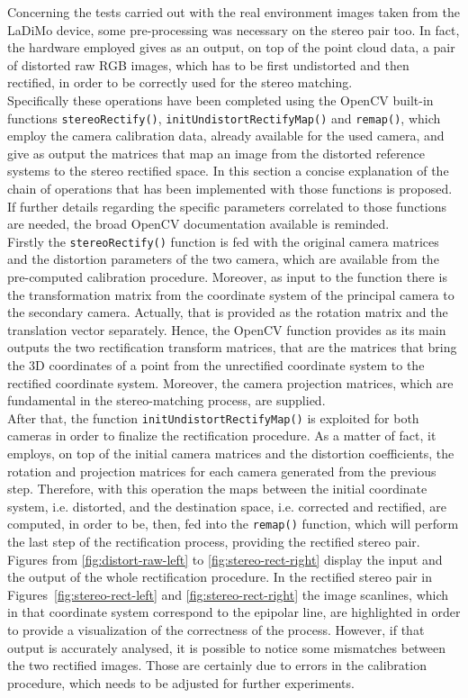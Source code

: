 Concerning the tests carried out with the real environment images taken from the LaDiMo device, some pre-processing was necessary on the stereo pair too. 
In fact, the hardware employed gives as an output, on top of the point cloud data, a pair of distorted raw RGB images, which has to be first undistorted and then rectified, in order to be correctly used for the stereo matching. \\
Specifically these operations have been completed using the OpenCV built-in functions \texttt{stereoRectify()}, \texttt{initUndistortRectifyMap()} and \texttt{remap()}, which employ the camera calibration data, already available for the used camera, and give as output the matrices that map an image from the distorted reference systems to the stereo rectified space.
In this section a concise explanation of the chain of operations that has been implemented with those functions is proposed.
If further details regarding the specific parameters correlated to those functions are needed, the broad OpenCV documentation available is reminded.\\
Firstly the \texttt{stereoRectify()} function is fed with the original camera matrices and the distortion parameters of the two camera, which are available from the pre-computed calibration procedure.
Moreover, as input to the function there is the transformation matrix from the coordinate system of the principal camera to the secondary camera.
Actually, that is provided as the rotation matrix and the translation vector separately.
Hence, the OpenCV function provides as its main outputs the two rectification transform matrices, that are the matrices that bring the 3D coordinates of a point from the unrectified coordinate system to the rectified coordinate system.
Moreover, the camera projection matrices, which are fundamental in the stereo-matching process, are supplied.\\
After that, the function \texttt{initUndistortRectifyMap()} is exploited for both cameras in order to finalize the rectification procedure.
As a matter of fact, it employs, on top of the initial camera matrices and the distortion coefficients, the rotation and projection matrices for each camera generated from the previous step.
Therefore, with this operation the maps between the initial coordinate system, i.e. distorted, and the destination space, i.e. corrected and rectified, are computed, in order to be, then, fed into the \texttt{remap()} function, which will perform the last step of the rectification process, providing the rectified stereo pair. \\
Figures from \ref{fig:distort-raw-left} to \ref{fig:stereo-rect-right} display the input and the output of the whole rectification procedure.
In the rectified stereo pair in Figures~\ref{fig:stereo-rect-left} and \ref{fig:stereo-rect-right} the image scanlines, which in that coordinate system correspond to the epipolar line, are highlighted in order to provide a visualization of the correctness of the process.
However, if that output is accurately analysed, it is possible to notice some mismatches between the two rectified images.
Those are certainly due to errors in the calibration procedure, which needs to be adjusted for further experiments.

